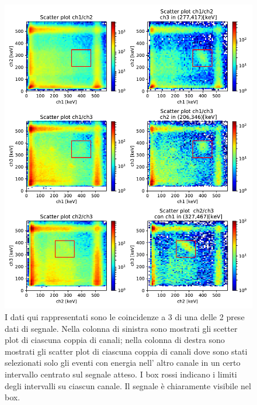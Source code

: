  \begin{figure}[h]
	\centering
	\includegraphics[width=38em]{immagini/3gamma_signal}
	\hspace{-3.5em}
	\caption{\label{fig:3gamma_signal} I dati qui rappresentati sono le coincidenze a 3 di una delle 2 prese dati di segnale. Nella colonna di sinistra sono mostrati gli scetter plot di ciascuna coppia di canali; nella colonna di destra sono mostrati gli scatter plot di ciascuna coppia di canali dove sono stati selezionati solo gli eventi con energia nell' altro canale in un certo intervallo centrato sul segnale atteso. I box rossi indicano i limiti degli intervalli su ciascun canale. Il segnale è chiaramente visibile nel box.}
\end{figure}

